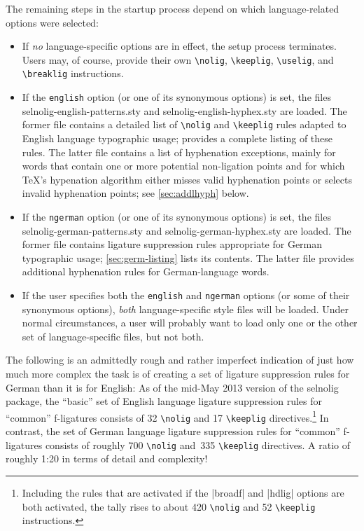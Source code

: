 \documentclass[11pt]{article}
\newcommand{\pkg}[1]{\textsf{#1}}
\newcommand{\opt}[1]{\texttt{#1}}
\newcommand{\cmmd}[1]{\texttt{\textbackslash #1}}
\begin{document}
The remaining steps in the startup process depend on which language-related options were selected:
\begin{itemize}
\item If \emph{no} language-specific options are in effect, the setup process terminates. Users may, of course, provide their own \cmmd{nolig}, \cmmd{keeplig}, \cmmd{uselig}, and \cmmd{breaklig} instructions.

\item If the \opt{english} option (or one of its synonymous options) is set, the files \pkg{selnolig-english-patterns.sty} and \pkg{selnolig-english-hyphex.sty} are loaded. The former file contains a detailed list of \cmmd{nolig} and \cmmd{keeplig} rules adapted to English language typographic usage;  provides a complete listing of these rules. The latter file contains a list of hyphenation exceptions, mainly for words that contain one or more potential non-ligation points and for which \TeX's hypenation algorithm either misses valid hyphenation points or selects invalid hyphenation points; see \cref{sec:addlhyph} below.

\item If the \opt{ngerman} option (or one of its synonymous options) is set, the files \pkg{selnolig-german-patterns.sty} and \pkg{selnolig-german-hyphex.sty} are loaded. The former file contains ligature suppression rules appropriate for German typographic usage; \cref{sec:germ-listing} lists its contents. The latter file provides additional hyphenation rules for German-language words.

\item If the user specifies both the \opt{english} and \opt{ngerman} options (or some of their synonymous options), \emph{both} language-specific style files will be loaded. Under normal circumstances, a user will probably want to load only one or the other set of language-specific files, but not both.
\end{itemize}

The following is an admittedly rough and rather imperfect indication of just how much more complex the task is of creating a set of ligature suppression rules for German than it is for English: As of the mid-May 2013 version of the \pkg{selnolig} package, the \enquote{basic} set of English language ligature suppression rules for \enquote{common} f-ligatures consists of 32 \cmmd{nolig} and 17 \cmmd{keeplig} directives.\footnote{Including the rules that are activated if the |broadf| and |hdlig| options are both activated, the tally rises to about 420 \cmmd{nolig} and 52 \cmmd{keeplig} instructions.} In contrast, the set of German language ligature suppression rules for \enquote{common} f-ligatures consists of roughly 700 \cmmd{nolig} and~335 \cmmd{keeplig} directives. A ratio of roughly 1:20 in terms of detail and complexity!
\end{document}
